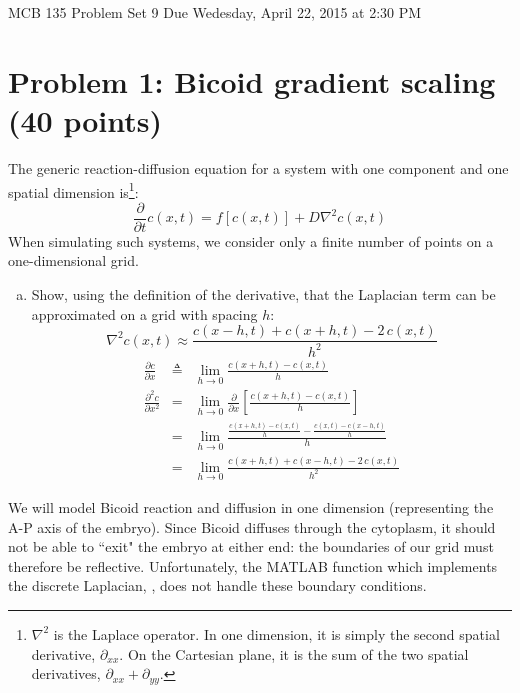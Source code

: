 \documentclass{article}
\begin{document}
\large

MCB 135 Problem Set 9 \hfill Due Wedesday, April 22, 2015 at 2:30 PM

\section*{Problem 1: Bicoid gradient scaling (40 points)}

The generic reaction-diffusion equation for a system with one component and one spatial dimension is\footnote{$\nabla^2$ is the Laplace operator. In one dimension, it is simply the second spatial derivative, $\partial_{xx}$. On the Cartesian plane, it is the sum of the two spatial derivatives, $\partial_{xx} + \partial_{yy}$.}:
\[ \frac{\partial}{\partial t} c(x,t) = f\left[ c(x,t) \right] + D \nabla^2  c(x,t) \]
When simulating such systems, we consider only a finite number of points on a one-dimensional grid.
\begin{enumerate}[a)]
\item Show, using the definition of the derivative, that the Laplacian term can be approximated on a grid with spacing $h$:
\[  \nabla^2 c(x,t) \approx  \frac{c(x-h,t) + c(x+h,t) - 2 \, c(x,t)}{h^2} \]
{\color{red}
\begin{eqnarray*}
\frac{\partial c}{\partial x} & \triangleq & \lim_{h \to 0} \frac{c(x+h,t) - c(x,t)}{h}\\
\frac{\partial^2 c}{\partial x^2} & = & \lim_{h \to 0} \frac{\partial}{\partial x} \left[ \frac{c(x+h,t) - c(x,t)}{h} \right]\\
& = & \lim_{h \to 0} \frac{\frac{c(x+h,t) - c(x,t)}{h} - \frac{c(x,t) - c(x-h,t)}{h}}{h} \\
& = & \lim_{h \to 0} \frac{c(x+h,t) + c(x-h,t) - 2 \, c(x,t)}{h^2}
\end{eqnarray*}
}
\end{enumerate}
We will model Bicoid reaction and diffusion in one dimension (representing the A-P axis of the embryo). Since Bicoid diffuses through the cytoplasm, it should not be able to ``exit" the embryo at either end: the boundaries of our grid must therefore be reflective. Unfortunately, the MATLAB function which implements the discrete Laplacian, , does not handle these boundary conditions.
\end{document}
